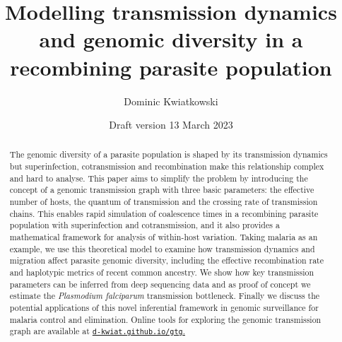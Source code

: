 \documentclass[hidelinks,10pt]{article}
\title{Modelling transmission dynamics and genomic diversity in a recombining parasite population}
\date{Draft version 13 March 2023}
\author{Dominic Kwiatkowski}
\begin{document}
\maketitle

\begin{abstract}

The genomic diversity of a parasite population is shaped by its transmission dynamics but superinfection, cotransmission and recombination make this relationship complex and hard to analyse.  This paper aims to simplify the problem by introducing the concept of a genomic transmission graph with three basic parameters: the effective number of hosts, the quantum of transmission and the crossing rate of transmission chains.  This enables rapid simulation of coalescence times in a recombining parasite population with superinfection and cotransmission, and it also provides a mathematical framework for analysis of within-host variation. Taking malaria as an example, we use this theoretical model to examine how transmission dynamics and migration affect parasite genomic diversity, including the effective recombination rate and haplotypic metrics of recent common ancestry.  We show how key transmission parameters can be inferred from deep sequencing data and as proof of concept we estimate the \textit{Plasmodium falciparum} transmission bottleneck.  Finally we discuss the potential applications of this novel inferential framework in genomic surveillance for malaria control and elimination.  Online tools for exploring the genomic transmission graph are available at \href{https://d-kwiat.github.io/gtg}{\texttt{d-kwiat.github.io/gtg}.}


\end{abstract}
\end{document}
